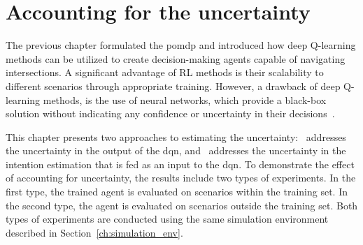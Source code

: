 \chapter{Accounting for the uncertainty}\label{ch:uncertainty}

The previous chapter formulated the \gls{pomdp} and introduced how deep Q-learning methods can be utilized to create decision-making agents capable of navigating intersections. A significant advantage of RL methods is their scalability to different scenarios through appropriate training. However, a drawback of deep Q-learning methods, is the use of neural networks, which provide a black-box solution without indicating any confidence or uncertainty in their decisions~\cite{thrun2005probabilistic}.

This chapter presents two approaches to estimating the uncertainty: \paperEnsamble \ addresses the uncertainty in the output of the \gls{dqn}, and \paperBelief \ addresses the uncertainty in the intention estimation that is fed as an input to the \gls{dqn}.
To demonstrate the effect of accounting for uncertainty, the results include two types of experiments. In the first type, the trained agent is evaluated on scenarios within the training set. In the second type, the agent is evaluated on scenarios outside the training set. Both types of experiments are conducted using the same simulation environment described in Section~\ref{ch:simulation_env}.

